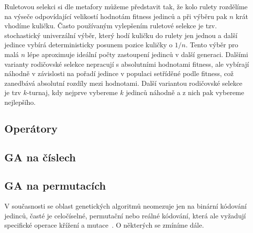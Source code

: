 Ruletovou selekci si dle metafory můžeme představit tak, že kolo rulety rozdělíme na výseče odpovídající velikostí hodnotám fitness jedinců a při výběru pak $n$ krát vhodíme kuličku. Často používaným vylepšením ruletové selekce je tzv. stochastický univerzální výběr, který hodí kuličku do rulety jen jednou a další jedince vybírá deterministicky posunem pozice kuličky o $1/n$. Tento výběr pro malá $n$ lépe aproximuje ideální počty zastoupení jedinců v další generaci. Dalšími varianty rodičovské selekce nepracují s absolutními hodnotami fitness, ale vybírají náhodně v závislosti na pořadí jedince v populaci setříděné podle fitness, což zanedbává absolutní rozdíly mezi hodnotami. Další variantou rodičovské selekce je tzv $k$-turnaj, kdy nejprve vybereme $k$ jedinců náhodně a z nich pak vybereme nejlepšího. 

\subsection{Operátory}

\subsection{GA na číslech}

\subsection{GA na permutacích}



V současnosti se oblast genetických algoritmů neomezuje jen na binární kódování jedinců, časté je celočíselné, permutační nebo reálné kódování, která ale vyžadují specifické operace křížení a mutace~\cite{Michalewicz:1996, Mitchell:1996}. O některých se zmíníme dále. 
